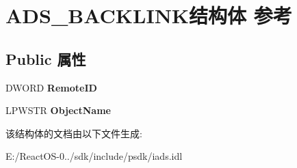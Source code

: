 \hypertarget{struct_a_d_s___b_a_c_k_l_i_n_k}{}\section{A\+D\+S\+\_\+\+B\+A\+C\+K\+L\+I\+N\+K结构体 参考}
\label{struct_a_d_s___b_a_c_k_l_i_n_k}
\subsection*{Public 属性}
\begin{DoxyCompactItemize}
\item 
\mbox{\label{struct_a_d_s___b_a_c_k_l_i_n_k_a3ce0e4027393597911a9f902da0cf541}} 
D\+W\+O\+RD {\bfseries Remote\+ID}
\item 
\mbox{\label{struct_a_d_s___b_a_c_k_l_i_n_k_a0740c497f9bc83faa13121284b6d6fe7}} 
L\+P\+W\+S\+TR {\bfseries Object\+Name}
\end{DoxyCompactItemize}


该结构体的文档由以下文件生成\+:\begin{DoxyCompactItemize}
\item 
E\+:/\+React\+O\+S-\/0../sdk/include/psdk/iads.\+idl\end{DoxyCompactItemize}

